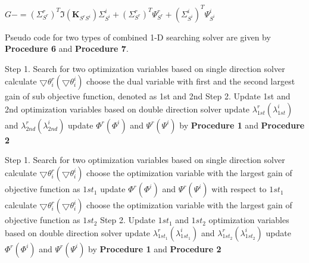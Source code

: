 \documentclass[12pt, draftclsnofoot, onecolumn]{IEEEtran}
\begin{document}
\begin{spacing}{2}
\begin{algorithm}[htb]
\begin{algorithmic}
\State $G-=(\Sigma^{r}_{S^{r}})^{T}\Im(\mathbf{K}_{S^{r}S^{i}})\Sigma^{i}_{S^{i}}+(\Sigma^{r}_{S^{r}})^{T}\Psi^{r}_{S^{r}}+(\Sigma^{i}_{S^{i}})^{T}\Psi^{i}_{S^{i}}$ 
\EndProcedure
\label{update G Phi and Psi}
\end{algorithmic}
\end{algorithm}


Pseudo code for two types of combined 1-D searching solver are given by \textbf{Procedure 6} and \textbf{Procedure 7}. 
\begin{algorithm}[htb]
\begin{algorithmic}
\State Step 1. Search for two optimization variables based on single direction solver
\State calculate $\bigtriangledown \theta^{r}_{i}(\bigtriangledown \theta_{i}^{i})$
\EndFor
\State choose the dual variable with first and the second largest gain of sub objective function, denoted as 1st and 2nd
\State Step 2. Update 1st and 2nd optimization variables based on double direction solver 
\State update $\lambda^{r}_{1st}(\lambda^{i}_{1st})$ and $\lambda^{r}_{2nd}(\lambda^{i}_{2nd})$
\State update $\Phi^{r}(\Phi^{i})$ and $\Psi^{r}(\Psi^{i})$ by \textbf{Procedure 1} and \textbf{Procedure 2}
\EndProcedure
\end{algorithmic}
\label{1D2D Nodamping}
\end{algorithm} 
 
 
 \begin{algorithm}[htb]
\begin{algorithmic}
\State Step 1. Search for two optimization variables based on single direction solver
\State calculate $\bigtriangledown \theta_{i}^{r}(\bigtriangledown \theta_{i}^{i})$ 
\EndFor
\State choose the optimization variable with the largest gain of objective function as $1st_{1}$
\State update $\Phi^{r}(\Phi^{i})$ and $\Psi^{r}(\Psi^{i})$ with respect to $1st_{1}$
 
\State calculate $\bigtriangledown \theta_{i}^{r}(\bigtriangledown \theta_{i}^{i})$ 
\EndFor
\State choose the optimization variable with the largest gain of objective function as $1st_{2}$
\State Step 2. Update $1st_{1}$ and $1st_{2}$ optimization variables based on double direction solver 
\State update $\lambda^{r}_{1st_{1}}(\lambda^{i}_{1st_{1}})$ and $\lambda^{r}_{1st_{2}}(\lambda^{i}_{1st_{2}})$
\State update $\Phi^{r}(\Phi^{i})$ and $\Psi^{r}(\Psi^{i})$ by \textbf{Procedure 1} and \textbf{Procedure 2}


\end{algorithmic}
\end{algorithm}
\end{spacing}
\end{document}

